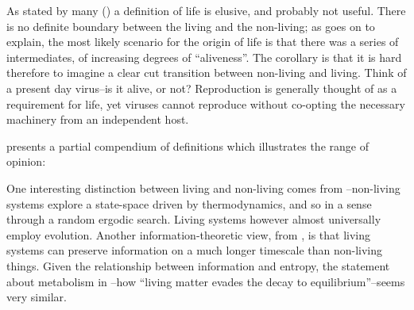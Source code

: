 As stated by many (\eg \autocite{Pascal2013}) a definition of life is elusive, and probably not useful. There is no definite boundary between the living and the non-living; as \autocite{Pascal2013} goes on to explain, the most likely scenario for the origin of life is that there was a series of intermediates, of increasing degrees of ``aliveness''. The corollary is that it is hard therefore to imagine a clear cut transition between non-living and living. Think of a present day virus--is it alive, or not? Reproduction is generally thought of as a requirement for life, yet viruses cannot reproduce without co-opting the necessary machinery from an independent host. 

\autocite{Fernando:2007pf} presents a partial compendium of definitions which illustrates the range of opinion:


One interesting distinction between living and non-living comes from \autocite{Rasmussen2004}--non-living systems explore a state-space driven by thermodynamics, and so in a sense through a random ergodic search. Living systems however almost universally employ evolution. Another information-theoretic view, from \autocite{Adami2015}, is that living systems can preserve information on a much longer timescale than non-living things. Given the relationship between information and entropy, the statement about metabolism in \cite{Schrodinger1944}--how ``living matter evades the decay to equilibrium''--seems very similar.

